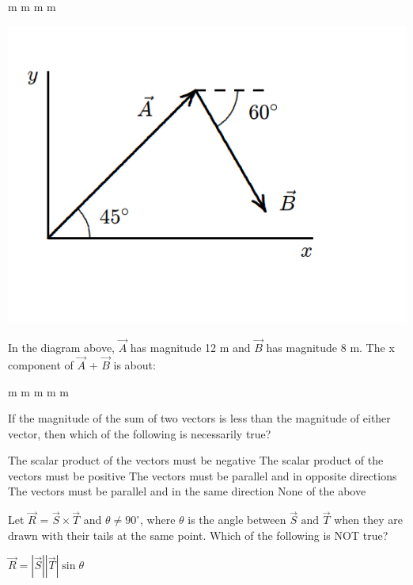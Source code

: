 \documentclass[12pt,addpoints]{exam}
\begin{document}
{{{\begin{questions}
\begin{oneparchoices}
						 m
						 m
						 m
						 m
					\end{oneparchoices}
					\begin{center}
						\includegraphics[scale=0.3]{vecs3.png}
					\end{center}
					\question In the diagram above, $\vec{A}$ has magnitude 12 m and $\vec{B}$ has magnitude 8 m. The x component of $\vec{A}$ + $\vec{B}$
					is about: \\
					\begin{oneparchoices}
						 m
						 m
						 m
						 m
						 m
					\end{oneparchoices}
					\question If the magnitude of the sum of two vectors is less than the magnitude of either vector, then which of the following is necessarily true?
					\begin{choices}
						\choice The scalar product of the vectors must be negative
						\choice The scalar product of the vectors must be positive
						\choice The vectors must be parallel and in opposite directions
						\choice The vectors must be parallel and in the same direction
						\choice None of the above
					\end{choices}
					\question Let $\vec{R}$ = $\vec{S}\times\vec{T}$ and $\theta\neq90^\circ$, where $\theta$ is the angle between $\vec{S}\text{ and }\vec{T}$ when they are drawn with their tails at the same point. Which of the following is NOT true? \\
					\begin{oneparchoices}
						\choice $\vec{R}=|\vec{S}||\vec{T}|\sin\theta$

\end{oneparchoices}
\end{questions}}}}
\end{document}
